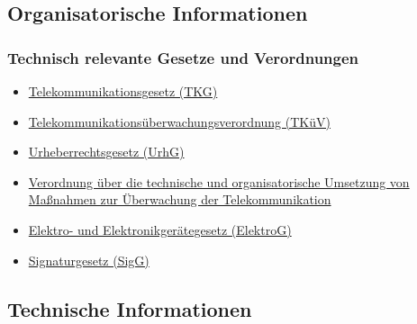 \documentclass[]{article}
\begin{document}
\subsection{}\label{section}
\newpage
\subsection{Organisatorische
Informationen}\label{organisatorische-informationen}

\subsubsection{Technisch relevante Gesetze und
Verordnungen}\label{technisch-relevante-gesetze-und-verordnungen}

\begin{itemize}
\item
  \href{http://www.gesetze-im-internet.de/tkg_2004/index.html}{Telekommunikationsgesetz
  (TKG)}
\item
  \href{http://www.gesetze-im-internet.de/tk_v_2005/index.html}{Telekommunikationsüberwachungsverordnung
  (TKüV)}
\item
  \href{http://www.gesetze-im-internet.de/urhg/index.html}{Urheberrechtsgesetz
  (UrhG)}
\item
  \href{https://www.gesetze-im-internet.de/tk_v_2005/index.html\#BJNR313600005BJNE001301308}{Verordnung
  über die technische und organisatorische Umsetzung von Maßnahmen zur
  Überwachung der Telekommunikation}
\item
  \href{http://www.gesetze-im-internet.de/elektrog/index.html}{Elektro-
  und Elektronikgerätegesetz (ElektroG)}
\item
  \href{http://www.gesetze-im-internet.de/sigg_2001/}{Signaturgesetz
  (SigG)}
\end{itemize}

\subsection{Technische Informationen}\label{technische-informationen}
\end{document}

